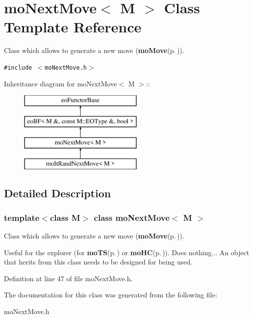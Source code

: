 \section{mo\-Next\-Move$<$ M $>$ Class Template Reference}
\label{classmo_next_move}
Class which allows to generate a new move ({\bf mo\-Move}{\rm (p.\,\pageref{classmo_move})}).  


{\tt \#include $<$mo\-Next\-Move.h$>$}

Inheritance diagram for mo\-Next\-Move$<$ M $>$::\begin{figure}[H]
\begin{center}
\leavevmode
\includegraphics[height=4cm]{classmo_next_move}
\end{center}
\end{figure}


\subsection{Detailed Description}
\subsubsection*{template$<$class M$>$ class mo\-Next\-Move$<$ M $>$}

Class which allows to generate a new move ({\bf mo\-Move}{\rm (p.\,\pageref{classmo_move})}). 

Useful for the explorer (for {\bf mo\-TS}{\rm (p.\,\pageref{classmo_t_s})} or {\bf mo\-HC}{\rm (p.\,\pageref{classmo_h_c})}). Does nothing... An object that herits from this class needs to be designed for being used. 



Definition at line 47 of file mo\-Next\-Move.h.

The documentation for this class was generated from the following file:\begin{CompactItemize}
\item 
mo\-Next\-Move.h\end{CompactItemize}

